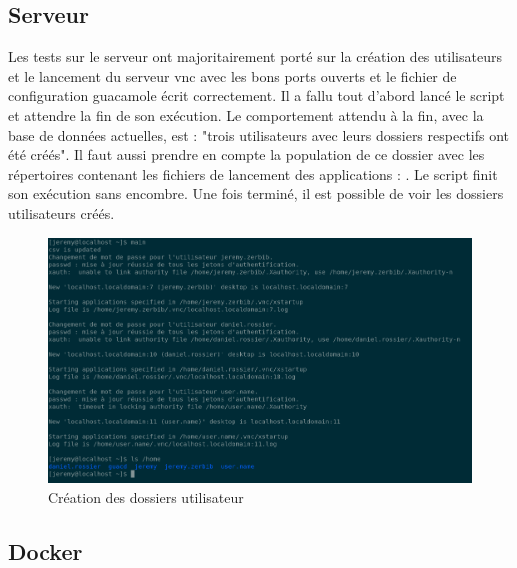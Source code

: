 \subsection{Serveur}
Les tests sur le serveur ont majoritairement porté sur la création des utilisateurs et le lancement du serveur \acrshort{vnc} avec les bons ports ouverts et le fichier de configuration guacamole écrit correctement.
Il a fallu tout d'abord lancé le script  et attendre la fin de son exécution. 
Le comportement attendu à la fin, avec la base de données actuelles, est : "trois utilisateurs avec leurs dossiers  respectifs ont été créés".
Il faut aussi prendre en compte la population de ce dossier avec les répertoires contenant les fichiers de lancement des applications : .
\newline
Le script  finit son exécution sans encombre.
Une fois terminé, il est possible de voir les dossiers utilisateurs créés.
\begin{figure}[H]
	\centering
	\includegraphics[scale=0.2]{images/main_home.png}
	\caption{Création des dossiers utilisateur}
	\label{fig:main_home}
\end{figure}



\subsection{Docker}

